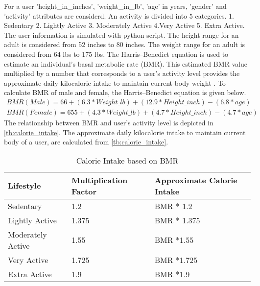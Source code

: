 For a user 'height\_in\_inches', 'weight\_in\_lb', 'age' in years, 'gender' and 'activity' attributes are considerd. An activity is divided  into 5 categories. 1. Sedentary 2. Lightly Active 3. Moderately Active 4.Very Active 5. Extra Active. The user information is simulated with python script. The height range for an adult is considered from 52 inches to 80 inches. The weight range for an adult is considered from 64 lbs to 175 lbs. The Harris–Benedict equation is used to estimate an individual's basal metabolic rate (BMR). This estimated BMR value multiplied by a number that corresponds to a user's activity level provides the approximate daily kilocalorie intake to maintain current body weight \cite{}. To calculate BMR of male and female, the Harris–Benedict equation is given below.
\begin{align}
BMR (Male) = 66 + (6.3 * Weight\_lb) + (12.9 * Height\_inch) - (6.8 * age) \\
BMR (Female) = 655 + (4.3 * Weight\_lb) + (4.7 * Height\_inch) - (4.7 * age)
\end{align}
The relationship between BMR and user's activity level is depicted in \autoref{tb:calorie_intake}.  The approximate daily kilocalorie intake to maintain current body of a user, are calculated from \autoref{tb:calorie_intake}. 
\begin{table}[]
\begin{tabular}{|l|l|l|}
\hline
\rowcolor[HTML]{C0C0C0} 
{\color[HTML]{333333} \textbf{Lifestyle}} & {\color[HTML]{333333} \textbf{Multiplication Factor}} & {\color[HTML]{333333} \textbf{Approximate Calorie Intake}} \\ \hline
Sedentary                                 & 1.2                                                   & BMR * 1.2                                                  \\ \hline
Lightly Active                           & 1.375                                                 & BMR * 1.375                                                \\ \hline
Moderately Active                        & 1.55                                                  & BMR *1.55                                                  \\ \hline
Very Active                              & 1.725                                                 & BMR *1.725                                                 \\ \hline
Extra Active                         & 1.9                                                   & BMR *1.9                                                   \\ \hline
\end{tabular}
\caption{Calorie Intake based on BMR}
\label{tb:calorie_intake}
\end{table}
